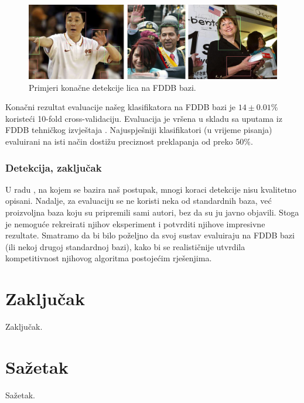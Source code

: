\documentclass[times, utf8, seminar, numeric]{fer}
\begin{document}
\begin{figure}[!htb]
\centering
\includegraphics[width=\textwidth]{raw/fddb_bboxes.jpg}
\caption{Primjeri konačne detekcije lica na FDDB bazi.}
\label{fig:fddb_bboxes}
\end{figure}

Konačni rezultat evaluacije našeg klasifikatora na FDDB bazi je $14 \pm 0.01\%$ koristeći
10-fold cross-validaciju. Evaluacija je vršena u skladu sa uputama iz FDDB tehničkog izvještaja
\cite{fddbTech}. Najuspješniji klasifikatori (u vrijeme pisanja) evaluirani na isti način
dostižu preciznost preklapanja od preko $50\%$.

\subsection{Detekcija, zaključak}

U radu \cite{conf/isda/ChandrappaR12}, na kojem se bazira naš postupak, mnogi koraci detekcije nisu kvalitetno
opisani. Nadalje, za evaluaciju se ne koristi neka od standardnih baza,
već proizvoljna baza koju su pripremili sami autori, bez da su ju javno objavili. Stoga je nemoguće
rekreirati njihov eksperiment i potvrditi njihove impresivne rezultate. Smatramo da bi bilo poželjno
da svoj sustav evaluiraju na FDDB bazi (ili nekoj drugoj standardnoj bazi), kako bi se realističnije
utvrdila kompetitivnost njihovog algoritma postojećim rješenjima.

\chapter{Zaključak}
Zaključak.




\chapter{Sažetak}
Sažetak.
\end{document}
